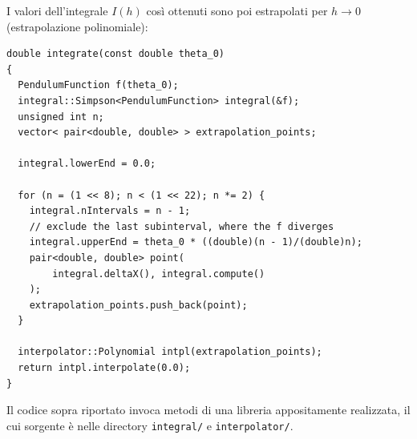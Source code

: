 \documentclass[a4paper]{article}
\begin{document}
I valori dell'integrale $I(h)$ così ottenuti sono poi estrapolati per 
$h\rightarrow0$ (estrapolazione polinomiale):
\begin{lstlisting} 
double integrate(const double theta_0)
{
  PendulumFunction f(theta_0);
  integral::Simpson<PendulumFunction> integral(&f);
  unsigned int n;
  vector< pair<double, double> > extrapolation_points;

  integral.lowerEnd = 0.0;

  for (n = (1 << 8); n < (1 << 22); n *= 2) {
    integral.nIntervals = n - 1;
    // exclude the last subinterval, where the f diverges
    integral.upperEnd = theta_0 * ((double)(n - 1)/(double)n);
    pair<double, double> point(
        integral.deltaX(), integral.compute()
    );
    extrapolation_points.push_back(point);
  }

  interpolator::Polynomial intpl(extrapolation_points);
  return intpl.interpolate(0.0);
}
\end{lstlisting}

Il codice sopra riportato invoca metodi di una libreria appositamente 
realizzata, il cui sorgente è nelle directory 
\texttt{integral/} e \texttt{interpolator/}.
\end{document}
